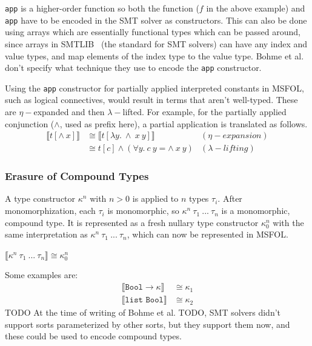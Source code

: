 \documentclass{article}
\begin{document}
	\texttt{app} is a higher-order 
	function so both the function 
	($f$ in the above example) and 
	\texttt{app} have to be encoded 
	in the SMT solver as constructors.
	This can also be done using arrays 
	which are essentially functional 
	types which can be passed
	around, since arrays in 
	SMTLIB~\cite{BarFT-SMTLIB} (the 
	standard for SMT solvers)
	can have any index and value types, 
	and map elements of the index type 
	to the value type. Bohme et al. 
	don't specify what technique 
	they use to encode the 
	\texttt{app} constructor.
	
	Using the \texttt{app} constructor
	for partially applied interpreted 
	constants in MSFOL, such as 
	logical connectives, would result 
	in terms that aren't well-typed.
	These are $\eta-$expanded and 
	then $\lambda-$lifted. For example, 
	for the partially applied 
	conjunction ($\land$, used as prefix 
	here), a partial application is 
	translated as follows.
	\begin{align*}
	\llbracket t [\land\ x] 
	\rrbracket &\cong \llbracket 
	t[\lambda y.\ \land\ x\ y]
	\rrbracket&(\eta-expansion)\\
	&\cong t[c]  \land (\forall y.\ 
	c\ y = \land\ x\ y) &(\lambda-lifting)
	\end{align*}
	
	\subsubsection{Erasure of Compound Types}
	A type constructor $\kappa^n$ with 
	$n > 0$ is applied to $n$ types 
	$\tau_i$. After monomorphization, 
	each $\tau_i$ is monomorphic, so 
	$\kappa^n\ \tau_1\ ...\ \tau_n$ 
	is a monomorphic, compound type. It
	is represented as a fresh nullary 
	type constructor $\kappa_0^n$ with 
	the same interpretation as 
	$\kappa^n\ \tau_1\ ...\ \tau_n$, 
	which can now be represented in 
	MSFOL.
	\begin{center}
		$\llbracket \kappa^n\ 
		\tau_1\ ...\ \tau_n \rrbracket
		\cong \kappa_0^n$
	\end{center}
	Some examples are:
	\begin{align*}
	\llbracket \texttt{Bool} \to
	\kappa \rrbracket &\cong \kappa_1\\
	\llbracket \texttt{list\ Bool}
	\rrbracket &\cong \kappa_2
	\end{align*}
	TODO At the time of writing of Bohme et al. TODO,
	SMT solvers didn't support sorts 
	parameterized by other sorts, but they 
	support them now, and these could be 
	used to encode compound types.
	
\end{document}
